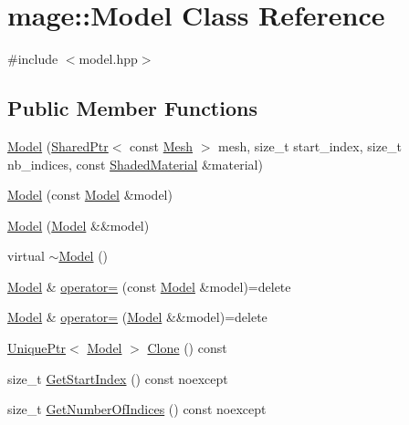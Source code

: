 \hypertarget{classmage_1_1_model}{}\section{mage\+:\+:Model Class Reference}
\label{classmage_1_1_model}


{\ttfamily \#include $<$model.\+hpp$>$}

\subsection*{Public Member Functions}
\begin{DoxyCompactItemize}
\item 
\hyperlink{classmage_1_1_model_aca2d5faa95a447ff3ecaab685aec8581}{Model} (\hyperlink{namespacemage_a1e01ae66713838a7a67d30e44c67703e}{Shared\+Ptr}$<$ const \hyperlink{classmage_1_1_mesh}{Mesh} $>$ mesh, size\+\_\+t start\+\_\+index, size\+\_\+t nb\+\_\+indices, const \hyperlink{structmage_1_1_shaded_material}{Shaded\+Material} \&material)
\item 
\hyperlink{classmage_1_1_model_ac5f1d340bbfefd30bec3e6343a86059a}{Model} (const \hyperlink{classmage_1_1_model}{Model} \&model)
\item 
\hyperlink{classmage_1_1_model_a71abc57cde3bd6270de88bfa3aa47601}{Model} (\hyperlink{classmage_1_1_model}{Model} \&\&model)
\item 
virtual \hyperlink{classmage_1_1_model_af9f45ed2dcf470f85bbfd144ca9857a7}{$\sim$\+Model} ()
\item 
\hyperlink{classmage_1_1_model}{Model} \& \hyperlink{classmage_1_1_model_a563515c64ec39cfcda9f6ca37576391b}{operator=} (const \hyperlink{classmage_1_1_model}{Model} \&model)=delete
\item 
\hyperlink{classmage_1_1_model}{Model} \& \hyperlink{classmage_1_1_model_a084e30d15822bfefa79128f30a57cc02}{operator=} (\hyperlink{classmage_1_1_model}{Model} \&\&model)=delete
\item 
\hyperlink{namespacemage_a8c307fbcc33bce9b7f2aa4c26c3b95cf}{Unique\+Ptr}$<$ \hyperlink{classmage_1_1_model}{Model} $>$ \hyperlink{classmage_1_1_model_a39d5f0b2b83729a68569072d69113ed7}{Clone} () const
\item 
size\+\_\+t \hyperlink{classmage_1_1_model_a876fcfe369f12e2d7edb6b533dd06252}{Get\+Start\+Index} () const noexcept
\item 
size\+\_\+t \hyperlink{classmage_1_1_model_a37c9814a445159fd742bcc1b9a5a7b94}{Get\+Number\+Of\+Indices} () const noexcept
\item 

\end{DoxyCompactItemize}

